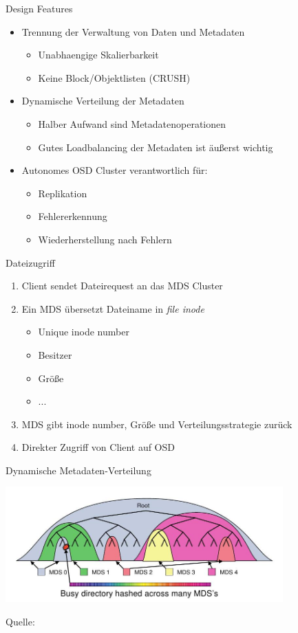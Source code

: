 \documentclass[hyperref={xetex}]{beamer}
\begin{document}
\begin{frame}{Design Features}
	\begin{itemize}
		\item Trennung der Verwaltung von Daten und Metadaten
		\begin{itemize}
			\item Unabhaengige Skalierbarkeit
			\item Keine Block/Objektlisten (CRUSH)
		\end{itemize}
		\item  Dynamische Verteilung der Metadaten
		\begin{itemize}
			\item Halber Aufwand sind Metadatenoperationen
			\item Gutes Loadbalancing der Metadaten ist \"außerst wichtig %
		\end{itemize}
		\item Autonomes OSD Cluster verantwortlich f\"ur:
			\begin{itemize}
				\item Replikation
				\item Fehlererkennung
				\item Wiederherstellung nach Fehlern
			\end{itemize}
	\end{itemize}	
\end{frame}

\begin{frame}{Dateizugriff}

\begin{enumerate}
	\item Client sendet Dateirequest an das MDS Cluster
	\item Ein MDS \"ubersetzt Dateiname in \textit{file inode}
	\begin{itemize}
		\item Unique inode number
		\item Besitzer
		\item Gr\"oße
		\item ...
	\end{itemize}
	\item MDS gibt inode number, Gr\"oße und Verteilungsstrategie zur\"uck
	\item Direkter Zugriff von Client auf OSD
\end{enumerate}
\end{frame}

\begin{frame}{Dynamische Metadaten-Verteilung}
	\begin{center}
		\includegraphics[width=0.8\textwidth]{images/mds.jpg}
	\end{center}
    Quelle: \cite{weil_ceph:_2006}
\end{frame}
\end{document}
